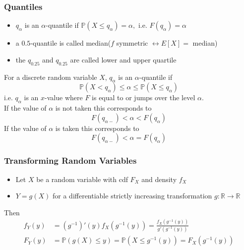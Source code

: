 \subsubsection{Quantiles}
\begin{itemize}
    \item $q_\alpha$ is an $\alpha$-quantile if $\mathbb{P}(X\leq q_\alpha)=\alpha,\text{ i.e. }F(q_\alpha)=\alpha$
    \item a $0.5$-quantile is called median\newline ($f$ symmetric $\leftrightarrow E[X]=$ median)
    \item the $q_{0.25}$ and $q_{0.25}$ are called lower and upper quartile
\end{itemize}

For a discrete random variable $X$, $q_\alpha$ is an $\alpha$-quantile if
\begin{equation*}
    \mathbb{P}(X<q_\alpha)\le\alpha\le\mathbb{P}(X\le q_\alpha)
\end{equation*}
i.e. $q_\alpha$ is an $x$-value where $F$ is equal to or jumps over the level $\alpha$.\\
If the value of $\alpha$ is not taken this corresponds to
\begin{equation*}
    F(q_{\alpha-})< \alpha < F(q_{\alpha})
\end{equation*}
If the value of $\alpha$ is taken this corresponds to
\begin{equation*}
    F(q_{\alpha-})< \alpha = F(q_{\alpha})
\end{equation*}

\subsubsection{Transforming Random Variables}
\begin{itemize}
    \item Let $X$ be a random variable with cdf $F_X$ and density $f_X$
    \item $Y=g(X)$ for a differentiable strictly increasing transformation $g:\mathbb{R}\to\mathbb{R}$
\end{itemize}
Then
\begin{align*}
    f_Y(y)   & =(g^{-1})'(y)f_X(g^{-1}(y))=\frac{f_X(g^{-1}(y))}{g'(g^{-1}(y))}     \\
    F_{Y}(y) & =\mathbb{P}(g(X)\leq y)=\mathbb{P}(X\leq g^{-1}(y))=F_{X}(g^{-1}(y))
\end{align*}

